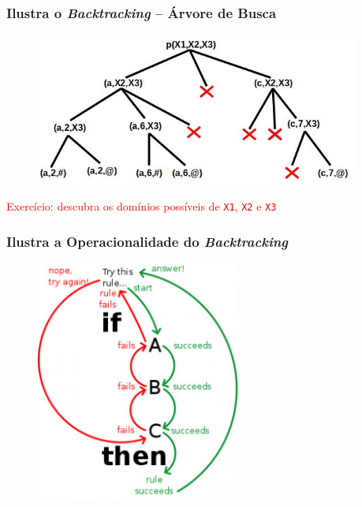 \begin{frame}[fragile]
\frametitle{Ilustra o \textit{Backtracking} -- Árvore de Busca}

\begin{figure}[!htb]
\begin{center}
\includegraphics[width=0.950\textwidth, height=0.8\textheight]{figures/ilustra_backtracking_03.jpg}
\end{center}
\end{figure}
\textcolor{red}{Exercício: descubra os domínios possíveis de \texttt{X1}, \texttt{X2} e \texttt{X3}}
\end{frame}


\begin{frame}[fragile]
\frametitle{Ilustra a Operacionalidade do \textit{Backtracking}}

\begin{figure}[!htb]
\begin{center}
\includegraphics[width=0.60\textwidth, height=0.75\textheight]{figures/ilustra_backtracking_02.jpg}
\end{center}
\end{figure}

\end{frame}

